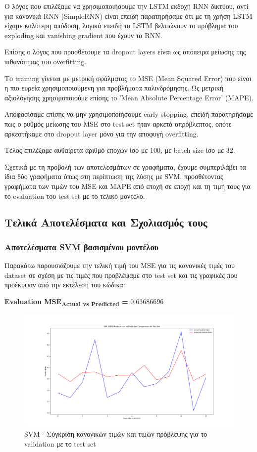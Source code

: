 \documentclass[12pt,a4paper]{article}
\begin{document}
Ο λόγος που επιλέξαμε να χρησιμοποιήσουμε την LSTM εκδοχή RNN δικτύου, αντί για κανονικά RNN (SimpleRNN) είναι επειδή παρατηρήσαμε ότι με τη χρήση LSTM είχαμε καλύτερη απόδοση, λογικά επειδή τα LSTM βελτιώνουν το πρόβλημα του exploding και vanishing gradient που έχουν τα RNN.

Επίσης ο λόγος που προσθέτουμε τα dropout layers είναι ως απόπειρα μείωσης της πιθανότητας του overfitting.

Το training γίνεται με μετρική σφάλματος το MSE (Mean Squared Error) που είναι η πιο ευρεία χρησιμοποιούμενη για προβλήματα παλινδρόμησης. Ως μετρική αξιολόγησης χρησιμοποιούμε επίσης το 'Mean Absolute Percentage Error' (MAPE).

Αποφασίσαμε επίσης να μην χρησιμοποιήσουμε early stopping, επειδή παρατηρήσαμε πως ο ρυθμός μείωσης του MSE στο test set ήταν αρκετά απρόβλεπτος, οπότε αρκεστήκαμε στο dropout layer μόνο για την αποφυγή overfitting.

Τέλος επιλέξαμε αυθαίρετα αριθμό εποχών ίσο με 100, με batch size ίσο με 32.

Σχετικά με τη προβολή των αποτελεσμάτων σε γραφήματα, έχουμε συμπεριλάβει τα ίδια δύο γραφήματα όπως στη περίπτωση της λύσης με SVM, προσθέτοντας γραφήματα των τιμών του MSE και MAPE από εποχή σε εποχή και τη τιμή τους για το evaluation του test set με το τελικό μοντέλο.

\subsection{Τελικά Αποτελέσματα και Σχολιασμός τους}

\subsubsection{Αποτελέσματα SVM βασισμένου μοντέλου}

Παρακάτω παρουσιάζουμε την τελική τιμή του MSE για τις κανονικές τιμές του dataset σε σχέση με τις τιμές που προβλέψαμε στο test set και τις γραφικές που προέκυψαν από την εκτέλεση του κώδικα:

\textbf{Evaluation MSE\textsubscript{Actual vs Predicted} =} 0.63686696

\begin{figure}[H]
	\includegraphics[width=\textwidth]{Figures/Question3/1. SVR Actual vs Predicted Test Set.png}
	\caption{SVM - Σύγκριση κανονικών τιμών και τιμών πρόβλεψης για το validation με το test set}
\end{figure}
\end{document}
